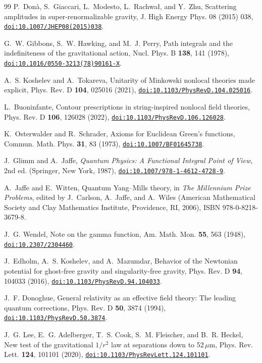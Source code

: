 \documentclass[aps,prd,10pt,twocolumn,superscriptaddress,nofootinbib,floatfix,longbibliography]{revtex4-2}
\newcommand{\doilink}[1]{\href{https://doi.org/#1}{\nolinkurl{doi:#1}}}
\begin{document}
\begin{thebibliography}{99}
P.~Don\`a, S.~Giaccari, L.~Modesto, L.~Rachwa{\l}, and Y.~Zhu, Scattering amplitudes in super-renormalizable gravity, J. High Energy Phys. 08 (2015) 038, \doilink{10.1007/JHEP08(2015)038}.

G.~W. Gibbons, S.~W. Hawking, and M.~J. Perry, Path integrals and the indefiniteness of the gravitational action, Nucl. Phys. B \textbf{138}, 141 (1978), \doilink{10.1016/0550-3213(78)90161-X}.

A.~S. Koshelev and A.~Tokareva, Unitarity of Minkowski nonlocal theories made explicit, Phys. Rev. D \textbf{104}, 025016 (2021), \doilink{10.1103/PhysRevD.104.025016}.

L.~Buoninfante, Contour prescriptions in string-inspired nonlocal field theories, Phys. Rev. D \textbf{106}, 126028 (2022), \doilink{10.1103/PhysRevD.106.126028}.

K.~Osterwalder and R.~Schrader, Axioms for Euclidean Green's functions, Commun. Math. Phys. \textbf{31}, 83 (1973), \doilink{10.1007/BF01645738}.

J.~Glimm and A.~Jaffe, \textit{Quantum Physics: A Functional Integral Point of View}, 2nd ed. (Springer, New York, 1987), \doilink{10.1007/978-1-4612-4728-9}.

A.~Jaffe and E.~Witten, Quantum Yang--Mills theory, in \textit{The Millennium Prize Problems}, edited by J.~Carlson, A.~Jaffe, and A.~Wiles (American Mathematical Society and Clay Mathematics Institute, Providence, RI, 2006), ISBN 978-0-8218-3679-8.

J.~G. Wendel, Note on the gamma function, Am. Math. Mon. \textbf{55}, 563 (1948), \doilink{10.2307/2304460}.

J.~Edholm, A.~S. Koshelev, and A.~Mazumdar, Behavior of the Newtonian potential for ghost-free gravity and singularity-free gravity, Phys. Rev. D \textbf{94}, 104033 (2016), \doilink{10.1103/PhysRevD.94.104033}.

J.~F. Donoghue, General relativity as an effective field theory: The leading quantum corrections, Phys. Rev. D \textbf{50}, 3874 (1994), \doilink{10.1103/PhysRevD.50.3874}.

J.~G. Lee, E.~G. Adelberger, T.~S. Cook, S.~M. Fleischer, and B.~R. Heckel, New test of the gravitational $1/r^2$ law at separations down to 52\,$\mu$m, Phys. Rev. Lett. \textbf{124}, 101101 (2020), \doilink{10.1103/PhysRevLett.124.101101}.


\end{thebibliography}
\end{document}
